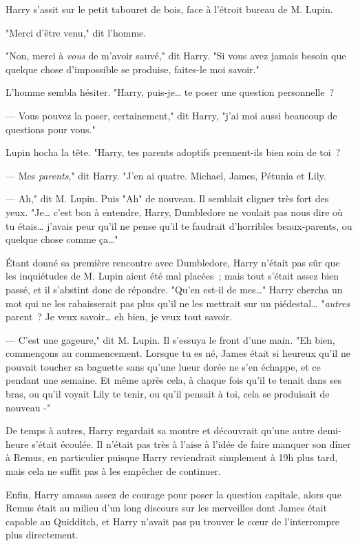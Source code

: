 Harry s'assit sur le petit tabouret de bois, face à l'étroit bureau de M. Lupin.

"Merci d'être venu," dit l'homme.

"Non, merci à \emph{vous} de m'avoir sauvé," dit Harry. "Si vous avez jamais besoin que quelque chose d'impossible se produise, faites-le moi savoir."

L'homme sembla hésiter. "Harry, puis-je… te poser une question personnelle~?

--- Vous pouvez la poser, certainement," dit Harry, "j'ai moi aussi beaucoup de questions pour vous."

Lupin hocha la tête. "Harry, tes parents adoptifs prennent-ils bien soin de toi~?

--- Mes \emph{parents}," dit Harry. "J'en ai quatre. Michael, James, Pétunia et Lily.

--- Ah," dit M. Lupin. Puis "Ah" de nouveau. Il semblait cligner très fort des yeux. "Je… c'est bon à entendre, Harry, Dumbledore ne voulait pas nous dire où tu étais… j'avais peur qu'il ne pense qu'il te faudrait d'horribles beaux-parents, ou quelque chose comme ça…"

Étant donné sa première rencontre avec Dumbledore, Harry n'était pas sûr que les inquiétudes de M. Lupin aient été mal placées~; mais tout s'était assez bien passé, et il s'abstint donc de répondre. "Qu'en est-il de mes…" Harry chercha un mot qui ne les rabaisserait pas plus qu'il ne les mettrait sur un piédestal… "\emph{autres} parent~? Je veux savoir… eh bien, je veux tout savoir.

--- C'est une gageure," dit M. Lupin. Il s'essuya le front d'une main. "Eh bien, commençons au commencement. Lorsque tu es né, James était si heureux qu'il ne pouvait toucher sa baguette sans qu'une lueur dorée ne s'en échappe, et ce pendant une semaine. Et même après cela, à chaque fois qu'il te tenait dans ses bras, ou qu'il voyait Lily te tenir, ou qu'il pensait à toi, cela se produisait de nouveau -"

\later

De temps à autres, Harry regardait sa montre et découvrait qu'une autre demi-heure s'était écoulée. Il n'était pas très à l'aise à l'idée de faire manquer son dîner à Remus, en particulier puisque Harry reviendrait simplement à 19h plus tard, mais cela ne suffit pas à les empêcher de continuer.

Enfin, Harry amassa assez de courage pour poser la question capitale, alors que Remus était au milieu d'un long discours sur les merveilles dont James était capable au Quidditch, et Harry n'avait pas pu trouver le cœur de l'interrompre plus directement.

